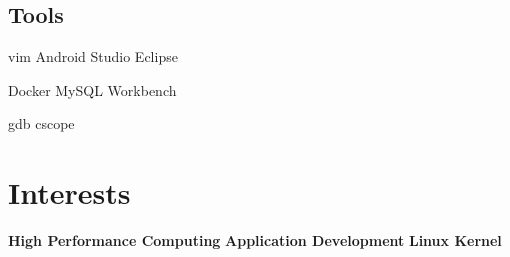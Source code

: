 \documentclass[letterpaper]{deedy-resume} %
\begin{document}
\begin{minipage}[t]{0.33\textwidth}
				 \subsection{Tools}
				 vim \textbullet{} Android Studio \textbullet{} Eclipse

				 Docker \textbullet{} MySQL Workbench

				 gdb \textbullet{} cscope

				 \sectionspace %

				 \section{Interests}
				 \textbullet{} \textbf{High Performance Computing} \textbullet{} \textbf{Application Development} \textbullet{} \textbf{Linux Kernel}


				 \end{minipage} %
				 \hfill
\end{document}

